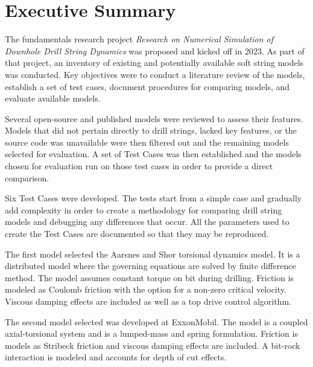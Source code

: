 \chapter*{Executive Summary}

The fundamentals research project \emph{Research on Numerical Simulation of Downhole Drill String Dynamics} was proposed and kicked off in 2023.  As part of that project, an inventory of existing and potentially available soft string models was conducted.  Key objectives were to conduct a literature review of the models, establish a set of test cases, document procedures for comparing models, and evaluate available models.

Several open-source and published models were reviewed to assess their features.  Models that did not pertain directly to drill strings, lacked key features, or the source code was unavailable were then filtered out and the remaining models selected for evaluation.  A set of Test Cases was then established and the models chosen for evaluation run on those test cases in order to provide a direct comparison.

Six Test Cases were developed.  The tests start from a simple case and gradually add complexity in order to create a methodology for comparing drill string models and debugging any differences that occur.  All the parameters used to create the Test Cases are documented so that they may be reproduced.

The first model selected the Aarsnes and Shor torsional dynamics model. It is a distributed model where the governing equations are solved by finite difference method. The model assumes constant torque on bit during drilling.  Friction is modeled as Coulomb friction with the option for a non-zero critical velocity.  Viscous damping effects are included as well as a top drive control algorithm.

The second model selected was developed at ExxonMobil. The model is a coupled axial-torsional system and is a lumped-mass and spring formulation. Friction is models as Stribeck friction and viscous damping effects are included.  A bit-rock interaction is modeled and accounts for depth of cut effects.


